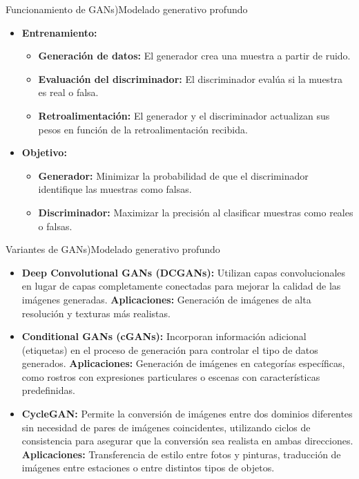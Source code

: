 \documentclass[10pt,border=3pt,tikz]{beamer}
\begin{document}
    \begin{frame}{Funcionamiento de GANs)}{Modelado generativo profundo}
        \begin{itemize}
            \item \textbf{Entrenamiento:} 
            \begin{itemize}
                \item \textbf{Generación de datos:} El generador crea una muestra a partir de ruido.
                \item \textbf{Evaluación del discriminador:} El discriminador evalúa si la muestra es real o falsa.
                \item \textbf{Retroalimentación:} El generador y el discriminador actualizan sus pesos en función de la retroalimentación recibida.
            \end{itemize}
            \item \textbf{Objetivo:} 
            \begin{itemize}
                \item \textbf{Generador:} Minimizar la probabilidad de que el discriminador identifique las muestras como falsas.
                \item \textbf{Discriminador:} Maximizar la precisión al clasificar muestras como reales o falsas.
            \end{itemize}
        \end{itemize}
    \end{frame}
    
    \begin{frame}{Variantes de GANs)}{Modelado generativo profundo}
        \begin{itemize}
            \item \textbf{Deep Convolutional GANs (DCGANs):} Utilizan capas convolucionales en lugar de capas completamente conectadas para mejorar la calidad de las imágenes generadas. \textbf{Aplicaciones:} Generación de imágenes de alta resolución y texturas más realistas.
            \item \textbf{Conditional GANs (cGANs):} Incorporan información adicional (etiquetas) en el proceso de generación para controlar el tipo de datos generados. \textbf{Aplicaciones:} Generación de imágenes en categorías específicas, como rostros con expresiones particulares o escenas con características predefinidas.
            \item \textbf{CycleGAN:}  Permite la conversión de imágenes entre dos dominios diferentes sin necesidad de pares de imágenes coincidentes, utilizando ciclos de consistencia para asegurar que la conversión sea realista en ambas direcciones. \textbf{Aplicaciones:} Transferencia de estilo entre fotos y pinturas, traducción de imágenes entre estaciones o entre distintos tipos de objetos.
        \end{itemize}
    \end{frame}
    
\end{document}
